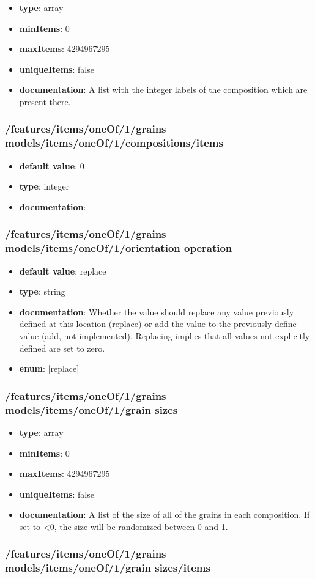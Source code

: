 \begin{itemize}\item {\bf type}: array
\item {\bf minItems}: 0
\item {\bf maxItems}: 4294967295
\item {\bf uniqueItems}: false
\item {\bf documentation}: A list with the integer labels of the composition which are present there.
\end{itemize}\subsubsection{/features/items/oneOf/1/grains models/items/oneOf/1/compositions/items}
\begin{itemize}\item {\bf default value}: 0
\item {\bf type}: integer
\item {\bf documentation}: 
\end{itemize}\subsubsection{/features/items/oneOf/1/grains models/items/oneOf/1/orientation operation}
\begin{itemize}\item {\bf default value}: replace
\item {\bf type}: string
\item {\bf documentation}: Whether the value should replace any value previously defined at this location (replace) or add the value to the previously define value (add, not implemented). Replacing implies that all values not explicitly defined are set to zero.
\item {\bf enum}: [replace]\end{itemize}\subsubsection{/features/items/oneOf/1/grains models/items/oneOf/1/grain sizes}
\begin{itemize}\item {\bf type}: array
\item {\bf minItems}: 0
\item {\bf maxItems}: 4294967295
\item {\bf uniqueItems}: false
\item {\bf documentation}: A list of the size of all of the grains in each composition. If set to <0, the size will be randomized between 0 and 1.
\end{itemize}\subsubsection{/features/items/oneOf/1/grains models/items/oneOf/1/grain sizes/items}
